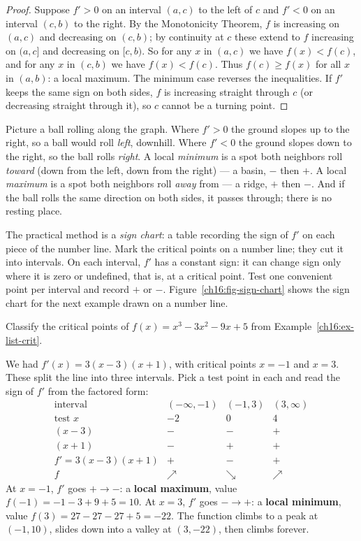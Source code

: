 \begin{proof}
Suppose $f'>0$ on an interval $(a,c)$ to the left of $c$ and $f'<0$ on an interval
$(c,b)$ to the right. By the Monotonicity Theorem, $f$ is increasing on $(a,c)$ and
decreasing on $(c,b)$; by continuity at $c$ these extend to $f$ increasing on
$(a,c]$ and decreasing on $[c,b)$. So for any $x$ in $(a,c)$ we have $f(x)<f(c)$,
and for any $x$ in $(c,b)$ we have $f(x)<f(c)$. Thus $f(c)\ge f(x)$ for all $x$ in
$(a,b)$: a local maximum. The minimum case reverses the inequalities. If $f'$ keeps
the same sign on both sides, $f$ is increasing straight through $c$ (or
decreasing straight through it), so $c$ cannot be a turning point.
\end{proof}

\begin{intuitionbox}
Picture a ball rolling along the graph. Where $f'>0$ the ground slopes up to the
right, so a ball would roll \emph{left}, downhill. Where $f'<0$ the ground slopes
down to the right, so the ball rolls \emph{right}. A local \emph{minimum} is a spot
both neighbors roll \emph{toward} (down from the left, down from the right) --- a
basin, $-$ then $+$. A local \emph{maximum} is a spot both neighbors roll
\emph{away} from --- a ridge, $+$ then $-$. And if the ball rolls the same
direction on both sides, it passes through; there is no resting place.
\end{intuitionbox}

The practical method is a \emph{sign chart}: a table recording the sign of $f'$
on each piece of the number line. Mark the critical points on a number
line; they cut it into intervals. On each interval, $f'$ has a constant sign:
it can change sign only where it is zero or undefined, that is, at a critical
point.
Test one convenient point per interval and record $+$ or $-$.
Figure~\ref{ch16:fig-sign-chart} shows the sign chart for the next example drawn
on a number line.

\begin{example}\label{ch16:ex-fdt}
Classify the critical points of $f(x)=x^3-3x^2-9x+5$ from
Example~\ref{ch16:ex-list-crit}.

\smallskip
We had $f'(x)=3(x-3)(x+1)$, with critical points $x=-1$ and $x=3$. These split the
line into three intervals. Pick a test point in each and read the sign of $f'$ from
the factored form:
\[
\begin{array}{c|ccc}
\text{interval} & (-\infty,-1) & (-1,3) & (3,\infty)\\\hline
\text{test } x & -2 & 0 & 4\\
(x-3) & - & - & +\\
(x+1) & - & + & +\\
f'=3(x-3)(x+1) & + & - & +\\
f & \nearrow & \searrow & \nearrow
\end{array}
\]
At $x=-1$, $f'$ goes $+\to-$: a \textbf{local maximum}, value
$f(-1)=-1-3+9+5=10$. At $x=3$, $f'$ goes $-\to+$: a \textbf{local minimum}, value
$f(3)=27-27-27+5=-22$. The function climbs to a peak at $(-1,10)$, slides down into
a valley at $(3,-22)$, then climbs forever.
\end{example}


